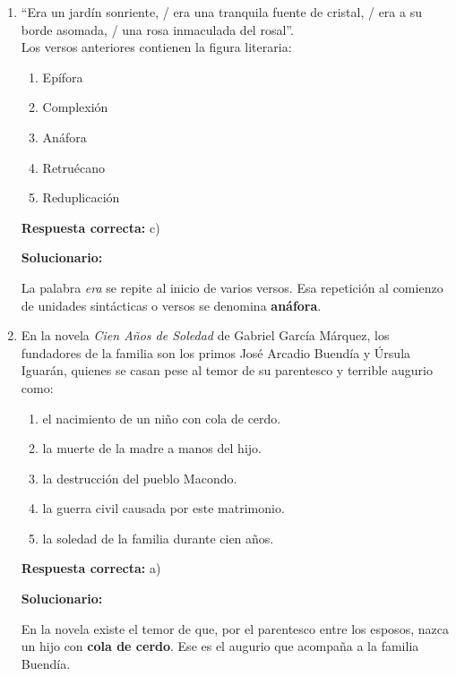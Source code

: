 \begin{enumerate}[resume]
	
	\item ``Era un jardín sonriente, / era una tranquila fuente de cristal, / era a su borde asomada, / una rosa inmaculada del rosal''.\\
	Los versos anteriores contienen la figura literaria:
	\begin{enumerate}[label=\alph*)]
		\item Epífora
		\item Complexión
		\item Anáfora
		\item Retruécano
		\item Reduplicación
	\end{enumerate}
	\textbf{Respuesta correcta:} c)
	
	\vspace{2mm}
	\textbf{Solucionario:}
	
	La palabra \textit{era} se repite al inicio de varios versos. Esa repetición al comienzo de unidades sintácticas o versos se denomina \textbf{anáfora}.
	
	\vspace{6mm}
	
	\item En la novela \textit{Cien Años de Soledad} de Gabriel García Márquez, los fundadores de la familia son los primos José Arcadio Buendía y Úrsula Iguarán, quienes se casan pese al temor de su parentesco y terrible augurio como:
	\begin{enumerate}[label=\alph*)]
		\item el nacimiento de un niño con cola de cerdo.
		\item la muerte de la madre a manos del hijo.
		\item la destrucción del pueblo Macondo.
		\item la guerra civil causada por este matrimonio.
		\item la soledad de la familia durante cien años.
	\end{enumerate}
	\textbf{Respuesta correcta:} a)
	
	\vspace{2mm}
	\textbf{Solucionario:}
	
	En la novela existe el temor de que, por el parentesco entre los esposos, nazca un hijo con \textbf{cola de cerdo}. Ese es el augurio que acompaña a la familia Buendía.
	
	\vspace{6mm}
	

\end{enumerate}

